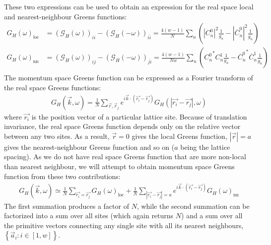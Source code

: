 \documentclass{article}
\numberwithin{equation}{section}
\begin{document}
These two expressions can be used to obtain an expression for the real space local and nearest-neighbour Greens functions:
\begin{equation}\begin{aligned}
	G_H(\omega)_\text{loc} &= \left(\mathcal{G}_H(\omega)\right)_{ii} - \left(\mathcal{G}_H(-\omega)\right)_{\overline{ii}} = \frac{4(w-1)}{N}\sum_n\left(|C^0_{n}|^2 \frac{1}{g_n} - |\overline C^0_{n}|^2 \frac{1}{\overline{g_n}}\right)\\
	G_H(\omega)_\text{nn} &= \left(\mathcal{G}_H(\omega)\right)_{ij} - \left(\mathcal{G}_H(-\omega)\right)_{\overline{ji}} = \frac{4(w-1)}{Nw}\sum_n\left({C^0_{n}}^* C^1_{n} \frac{1}{g_n} - {\overline C^0_{n}}^* \overline C^1_{n} \frac{1}{\overline{g_n}}\right)\\
\end{aligned}\end{equation}
The momentum space Greens function can be expressed as a Fourier transform of the real space Greens functions:
\begin{equation}\begin{aligned}
	G_H (\vec k, \omega) = \frac{1}{N}\sum_{\vec r, \vec r_j}e^{i \vec{k}\cdot\left(\vec{r_i} - \vec {r_j}\right)}G_H (|\vec{r_i} - \vec {r_j}|, \omega)
\end{aligned}\end{equation}
where $\vec{r_i}$ is the position vector of a particular lattice site. Because of translation invariance, the real space Greens function depends only on the relative vector between any two sites. As a result, $\vec r=0$ gives the local Greens function, $|\vec r|=a$ gives the nearest-neighbour Greens function and so on ($a$ being the lattice spacing). As we do not have real space Greens function that are more non-local than nearest neighbour, we will attempt to obtain momentum space Greens function from these two contributions:
\begin{equation}\begin{aligned}
	G_H (\vec k, \omega) \simeq \frac{1}{N}\sum_{\vec{r_i} = \vec {r_j}}G_H (\omega)_\text{loc} + \frac{1}{N}\sum_{|\vec{r_i} - \vec {r_j}|=a} e^{i \vec{k}\cdot\left(\vec{r_i} - \vec {r_j}\right)}G_H (\omega)_\text{nn}
\end{aligned}\end{equation}
The first summation produces a factor of $N$, while the second summation can be factorized into a sum over all sites (which again returns $N$) and a sum over all the primitive vectors connecting any single site with all its nearest neighbours, $\left\{ \vec a_i: i \in \left[1, w\right]\right\}$.
\end{document}
